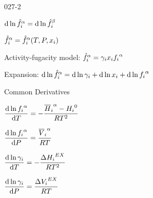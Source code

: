 \begin{mitframe}{027-2}

    
    
    \begin{listone}

		\item $\mathrm{d}\ln{\hat{\fug}_{\state}}^{\tdiff}=\mathrm{d}\ln{\hat{\fug}_{\state}}^{\texpcoeff}$
    
    	\begin{listtwo}
	
    		\item ${\hat{\fug}_{\state}}^{\tdiff}={\hat{\fug}_{\state}}^{\tdiff}(\Temp, \p, \conjcoor)$
            
            \item Activity-fugacity model: ${\hat{\fug}_{\state}}^{\tdiff}=\actcoeff\conjcoor{\fug_{\state}}^{\tdiff}$
	
		\end{listtwo}
	
    \item Expansion: $\mathrm{d}\ln{\hat{\fug}_{\state}}^{\tdiff}=\mathrm{d}\ln\actcoeff+\mathrm{d}\ln\conjcoor+\mathrm{d}\ln{\fug_{\state}}^{\tdiff}$
    
    	\begin{listtwo}

			\item Common Derivatives
            
            \begin{listthree}
			
            	\item $\dfrac{\mathrm{d}\ln{{\fug}_{\state}}^{\tdiff}}{\mathrm{d}\Temp}=-\dfrac{{\overline{\enthalpy}_{\state}}^{\tdiff}-{\enthalpy_{\state}}^{\init}}{\gasconst\Temp^{2}}$

            	\item $\dfrac{\mathrm{d}\ln{{\fug}_{\state}}^{\tdiff}}{\mathrm{d}\p}=\dfrac{{\overline{\vol}_{\state}}^{\tdiff}}{\gasconst\Temp}$
            
            	\item $\dfrac{\mathrm{d}\ln\actcoeff}{\mathrm{d}\Temp}=-\dfrac{\iipf{\enthalpy_{\state}}^{\exfunc}}{\gasconst\Temp^{2}}$
            
            	\item $\dfrac{\mathrm{d}\ln\actcoeff}{\mathrm{d}\p}=\dfrac{\iipf{\vol_{\state}}^{\exfunc}}{\gasconst\Temp}$
            

\end{listthree}
\end{listtwo}
\end{listone}
\end{mitframe}
